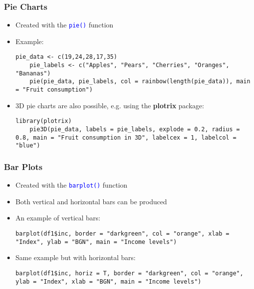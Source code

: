 \documentclass[10pt]{beamer}
\newcommand{\cc}[1]{\texttt{\textcolor{blue}{#1}}}
\theoremstyle{definition}
\begin{document}
\begin{frame}[fragile]
\frametitle{Pie Charts}
\begin{itemize}
	\item Created with the \cc{pie()} function
	\item Example:
	\begin{lstlisting}[style = rstyle, breaklines]
	pie_data <- c(19,24,28,17,35)
	pie_labels <- c("Apples", "Pears", "Cherries", "Oranges", "Bananas")
	pie(pie_data, pie_labels, col = rainbow(length(pie_data)), main = "Fruit consumption")
	\end{lstlisting}
	\item 3D pie charts are also possible, e.g. using the \textbf{plotrix} package:
	\begin{lstlisting}[style = rstyle, breaklines]
	library(plotrix)
	pie3D(pie_data, labels = pie_labels, explode = 0.2, radius = 0.8, main = "Fruit consumption in 3D", labelcex = 1, labelcol = "blue")
	\end{lstlisting}
\end{itemize}
\end{frame}

\begin{frame}[fragile]
\frametitle{Bar Plots}
\begin{itemize}
	\item Created with the \cc{barplot()} function
	\item Both vertical and horizontal bars can be produced
	\item An example of vertical bars:
	\begin{lstlisting}[style = rstyle, breaklines]
	barplot(df1$inc, border = "darkgreen", col = "orange", xlab = "Index", ylab = "BGN", main = "Income levels")
	\end{lstlisting}
	\item Same example but with horizontal bars:
	\begin{lstlisting}[style = rstyle, breaklines]
	barplot(df1$inc, horiz = T, border = "darkgreen", col = "orange", ylab = "Index", xlab = "BGN", main = "Income levels")
	\end{lstlisting}
	
\end{itemize}
\end{frame}
\end{document}
